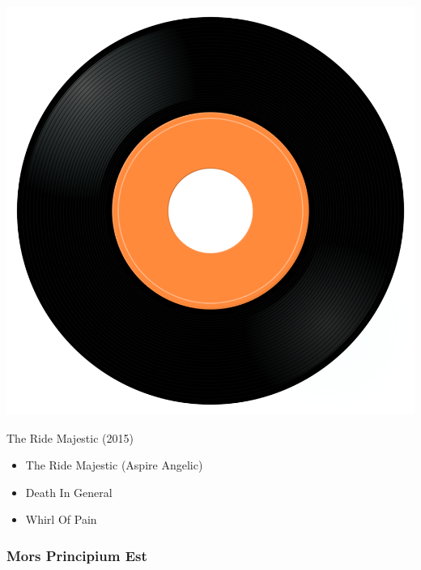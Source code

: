 \begin{minipage}[t]{0.25\textwidth}\vspace{0pt}
\captionsetup{type=figure}
\includegraphics[width=\textwidth]{Images/cover.png}
\caption*{The Ride Majestic (2015)}
\end{minipage}
\begin{minipage}[t]{0.25\textwidth}\vspace{0pt}
\begin{itemize}[nosep,leftmargin=1em,labelwidth=*,align=left]
	\setlength{\itemsep}{0pt}
	\item The Ride Majestic (Aspire Angelic)
	\item Death In General
	\item Whirl Of Pain
\end{itemize}
\end{minipage}


\subsubsection{Mors Principium Est}

